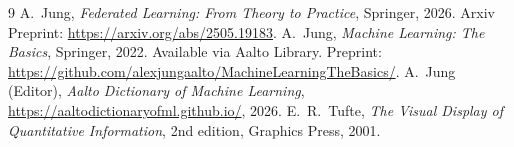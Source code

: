 \documentclass{article}
\begin{document}
\begin{thebibliography}{9}
	 A.~Jung, \textit{Federated Learning: From Theory to Practice}, Springer, 2026. Arxiv Preprint: \url{https://arxiv.org/abs/2505.19183}.
	 A.~Jung, \textit{Machine Learning: The Basics}, Springer, 2022. Available via Aalto Library. Preprint: \url{https://github.com/alexjungaalto/MachineLearningTheBasics/}.
	 A.~Jung (Editor), \textit{Aalto Dictionary of Machine Learning}, \url{https://aaltodictionaryofml.github.io/}, 2026.
	E.~R.~Tufte,
	\emph{The Visual Display of Quantitative Information},
	2nd edition, Graphics Press, 2001.
\end{thebibliography}
\end{document}
